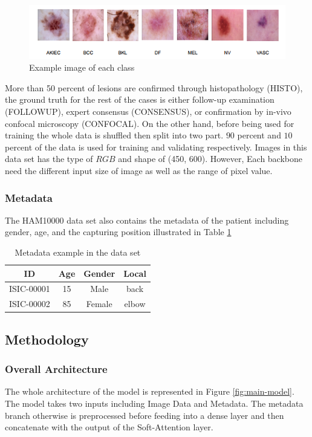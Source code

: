 \documentclass[sensors,article,submit,pdftex,moreauthors]{Definitions/mdpi}
\begin{document}
	\begin{figure}[H]
		\centering
		\includegraphics[width=1\linewidth]{Definitions/DataDistribution}
		\caption{Example image of each class}
		\label{fig:data-sample}
	\end{figure}
	
	More than 50 percent of lesions are confirmed through histopathology (HISTO), the ground truth for the rest of the cases is either follow-up examination (FOLLOWUP), expert consensus (CONSENSUS), or confirmation by in-vivo confocal microscopy (CONFOCAL). On the other hand, before being used for training the whole data is shuffled then split into two part. $90$ percent and $10$ percent of the data is used for training and validating respectively. Images in this data set has the type of $RGB$ and shape of (450, 600). However, Each backbone need the different input size of image as well as the range of pixel value.
	
	\subsubsection{Metadata}
	The HAM10000 data set \cite{10417} also contains the metadata of the patient including gender, age, and the capturing position illustrated in Table \ref{table:metadata sample}
	\begin{table}[H]
		\centering
		\begin{tabular}{|c c c c |} 
			\hline
			ID & Age & Gender & Local\\ 
			\hline
			ISIC-00001 & 15 & Male & back\\
			\hline
			ISIC-00002 & 85 & Female & elbow\\
			\hline
		\end{tabular}
		\caption{Metadata example in the data set}
		\label{table:metadata sample}
	\end{table}
	\subsection{Methodology}
	\subsubsection{Overall Architecture}
	The whole architecture of the model is represented in Figure \ref{fig:main-model}. The model takes two inputs including Image Data and Metadata. The metadata branch otherwise is preprocessed before feeding into a dense layer and then concatenate with the output of the Soft-Attention layer. 
	
\end{document}
